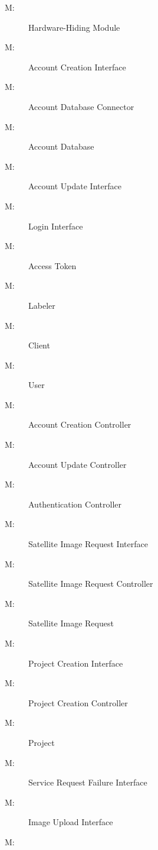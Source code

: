 \documentclass[12pt, titlepage]{article}
\newcounter{mnum}
\newcommand{\mthemnum}{M\themnum}
\begin{document}
\begin{description}



\item [ \mthemnum \label{mHH}:] Hardware-Hiding Module
\item [ \mthemnum \label{aci}:]
Account Creation Interface
\item [ \mthemnum \label{accdc}:]
Account Database Connector
\item [ \mthemnum \label{accd}:]
Account Database
\item [ \mthemnum \label{aui}:]
Account Update Interface
\item [ \mthemnum \label{li}:]
Login Interface
\item [ \mthemnum \label{at}:]
Access Token
\item [ \mthemnum \label{labeler}:]
Labeler
\item [ \mthemnum \label{client}:]
Client
\item [ \mthemnum \label{user}:]
User
\item [ \mthemnum \label{acc}:]
Account Creation Controller
\item [ \mthemnum \label{auc}:]
Account Update Controller
\item [ \mthemnum \label{ac}:]
Authentication Controller
\item [ \mthemnum \label{siri}:]
Satellite Image Request Interface
\item [ \mthemnum \label{sirc}:]
Satellite Image Request Controller
\item [ \mthemnum \label{sirf}:]
Satellite Image Request
\item [ \mthemnum \label{pci}:]
Project Creation Interface
\item [ \mthemnum \label{pcc}:]
Project Creation Controller
\item [ \mthemnum \label{project}:]
Project
\item [ \mthemnum \label{srfi}:]
Service Request Failure Interface
\item [ \mthemnum \label{iui}:]
Image Upload Interface
\item [ \mthemnum \label{ri}:]

\end{description}
\end{document}
